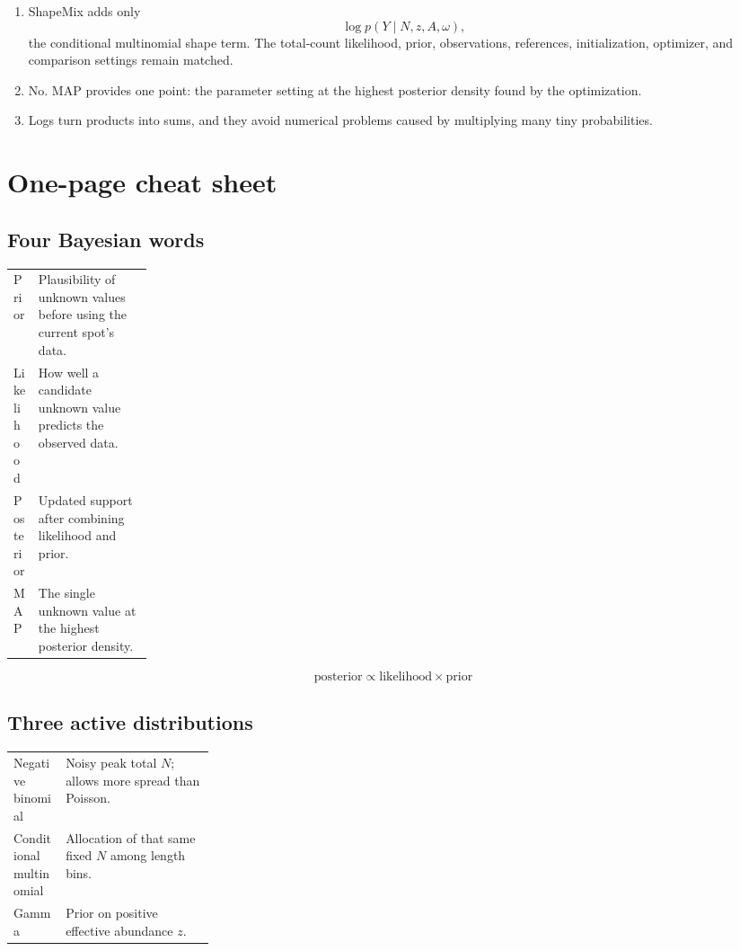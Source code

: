 \documentclass[11pt]{article}
\begin{document}
\begin{enumerate}[leftmargin=2.2em,label=\textbf{\arabic*.}]
  \item ShapeMix adds only
  \[
  \log p(Y\mid N,z,A,\omega),
  \]
  the conditional multinomial shape term. The total-count likelihood, prior,
  observations, references, initialization, optimizer, and comparison settings
  remain matched.

  \item No. MAP provides one point: the parameter setting at the highest posterior
  density found by the optimization.

  \item Logs turn products into sums, and they avoid numerical problems caused by
  multiplying many tiny probabilities.
\end{enumerate}

\newpage
\section{One-page cheat sheet}

\subsection*{Four Bayesian words}

\begin{center}
\begin{tabularx}{0.96\linewidth}{L{0.18\linewidth}X}
\toprule
Prior & Plausibility of unknown values before using the current spot's data. \\
Likelihood & How well a candidate unknown value predicts the observed data. \\
Posterior & Updated support after combining likelihood and prior. \\
MAP & The single unknown value at the highest posterior density. \\
\bottomrule
\end{tabularx}
\end{center}

\[
\boxed{\text{posterior}\propto\text{likelihood}\times\text{prior}}
\]

\subsection*{Three active distributions}

\begin{center}
\begin{tabularx}{0.96\linewidth}{L{0.26\linewidth}X}
\toprule
Negative binomial & Noisy peak total \(N\); allows more spread than Poisson. \\
Conditional multinomial & Allocation of that same fixed \(N\) among length bins. \\
Gamma & Prior on positive effective abundance \(z\). \\
\bottomrule
\end{tabularx}
\end{center}
\end{document}

